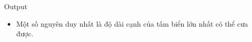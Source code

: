 Output  
\begin{itemize}
	\item     Một số nguyên duy nhất là độ dài cạnh của tấm biển lớn nhất có thể cưa được.   
\end{itemize}